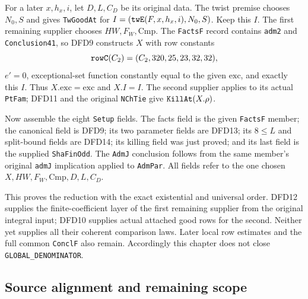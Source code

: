 \documentclass[11pt,a4paper]{article}
\numberwithin{equation}{section}
\theoremstyle{remark}\newtheorem{remark}[theorem]{Remark}
\begin{document}
For a later $x,h_x,i$, let $D,L,C_D$ be its original
data. The twist premise chooses $N_0,S$ and gives
\texttt{Tw\allowbreak Good\allowbreak At} for
$I=(\texttt{tw\allowbreak E}(F,x,h_x,i),N_0,S)$. Keep this $I$.
The first remaining supplier chooses $HW,F_W,\mathrm{Cmp}$.
The \texttt{Facts\allowbreak F} record contains \texttt{adm2} and
\texttt{Conclusion41}, so DFD9 constructs $X$ with
row constants
\[
            \texttt{row\allowbreak C}(C_2)=(C_2,320,25,23,32,32),
\]
$e'=0$, exceptional-set function constantly equal to
the given $\mathrm{exc}$, and exactly this $I$.
Thus $X.\mathrm{exc}=\mathrm{exc}$ and
$X.I=I$. The second supplier applies to its actual
\texttt{Pt\allowbreak Fam}; DFD11 and the original \texttt{NCh\allowbreak Tie}
give $\texttt{Kill\allowbreak At}(X.\rho)$.

Now assemble the eight \texttt{Setup} fields.
The facts field is the given \texttt{Facts\allowbreak F} member;
the canonical field is DFD9; its two parameter fields
are DFD13; its $8\le L$ and split-bound fields are
DFD14; its killing field was just proved; and its last
field is the supplied \texttt{Sha\allowbreak Fin\allowbreak Odd}. The
\texttt{Adm\allowbreak J} conclusion follows from the same member's
original \texttt{adm\allowbreak J} implication applied to
\texttt{Adm\allowbreak Par}. All fields refer to the one chosen
$X,HW,F_W,\mathrm{Cmp},D,L,C_D$.

This proves the reduction with the exact existential and
universal order. DFD12 supplies the finite-coefficient
layer of the first remaining supplier from the original
integral input; DFD10 supplies actual attached good rows
for the second. Neither yet supplies all their coherent
comparison laws. Later local row estimates and the full
common \texttt{Concl\allowbreak F} also remain. Accordingly this
chapter does not close \texttt{GLOBAL\_\allowbreak DENOMINATOR}.

\subsection{Source alignment and remaining scope}
\end{document}
